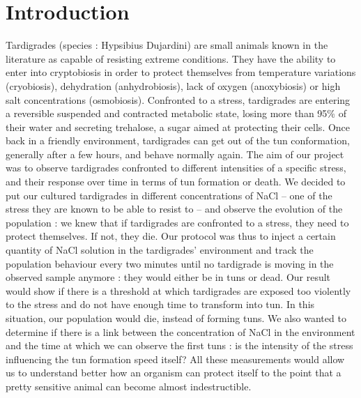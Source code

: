 \documentclass[12pt,a4paper, twocolumn]{article}
\begin{document}
\section{Introduction}
Tardigrades (species : Hypsibius Dujardini) are small animals known in the literature as capable of resisting extreme conditions. They have the ability to enter into cryptobiosis in order to protect themselves from temperature variations (cryobiosis), dehydration (anhydrobiosis), lack of oxygen (anoxybiosis) or high salt concentrations (osmobiosis). Confronted to a stress, tardigrades are entering a reversible suspended  and contracted metabolic state, losing more than 95\% of their water and secreting trehalose, a sugar aimed at protecting their cells. Once back in a friendly environment, tardigrades can get out of the tun conformation, generally after a few hours, and behave normally again.
The aim of our project was to observe tardigrades confronted to different intensities of a specific stress, and their response over time in terms of tun formation or death. We decided to put our cultured tardigrades in different concentrations of NaCl – one of the stress they are known to be able to resist to – and observe the evolution of the population : we knew that if tardigrades are confronted to a stress, they need to protect themselves. If not, they die. Our protocol was thus to inject a certain quantity of NaCl solution in the tardigrades’ environment and track the population behaviour every two minutes until no tardigrade is moving in the observed sample anymore : they would either be in tuns or dead. Our result would show if there is a threshold at which tardigrades are exposed too violently to the stress and do not have enough time to transform into tun. In this situation, our population would die, instead of forming tuns. We also wanted to determine if there is a link between the concentration of NaCl in the environment and the time at which we can observe the first tuns : is the intensity of the stress influencing the tun formation speed itself? All these measurements would allow us to understand better how an organism can protect itself to the point that a pretty sensitive animal can become almost indestructible. 
\end{document}
